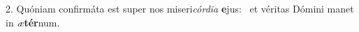 2. Quóniam confirmáta est super nos miseri\textit{cór}\textit{di}\textit{a} \textbf{e}jus: \ast\  et véritas Dómini manet in \textit{æ}\textbf{tér}num.\

